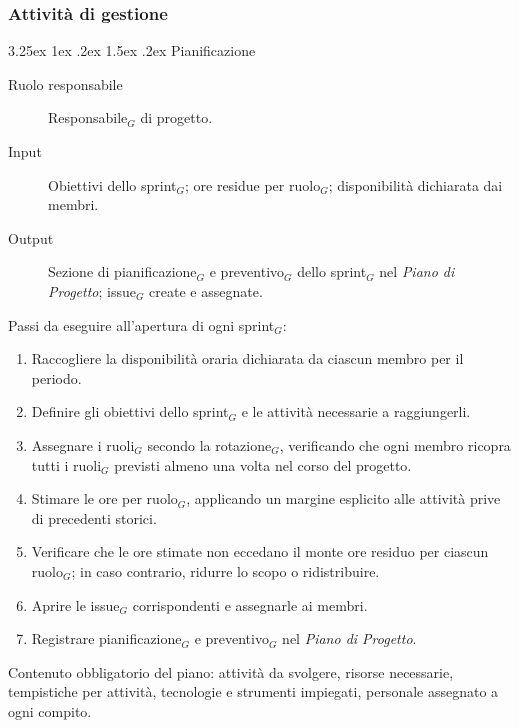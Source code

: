 \documentclass[a4paper, 10pt]{article}
\makeatletter
\renewcommand\paragraph{\@startsection{paragraph}{4}{\z@}%
  {3.25ex \@plus1ex \@minus .2ex}%
  {1.5ex \@plus .2ex}%
  {\normalfont\normalsize\bfseries}}
\makeatother
\begin{document}
\subsubsection{Attività di gestione}
\label{subsubsec:attivita_gestione}

\paragraph{Pianificazione}

\begin{description}
    \item[Ruolo responsabile] Responsabile$_G$ di progetto.
    \item[Input] Obiettivi dello sprint$_G$; ore residue per ruolo$_G$; disponibilità dichiarata dai membri.
    \item[Output] Sezione di pianificazione$_G$ e preventivo$_G$ dello sprint$_G$ nel \emph{Piano di Progetto}; issue$_G$ create e assegnate.
\end{description}

\noindent Passi da eseguire all'apertura di ogni sprint$_G$:
\begin{enumerate}
    \item Raccogliere la disponibilità oraria dichiarata da ciascun membro per il periodo.
    \item Definire gli obiettivi dello sprint$_G$ e le attività necessarie a raggiungerli.
    \item Assegnare i ruoli$_G$ secondo la rotazione$_G$, verificando che ogni membro ricopra tutti i ruoli$_G$ previsti almeno una volta nel corso del progetto.
    \item Stimare le ore per ruolo$_G$, applicando un margine esplicito alle attività prive di precedenti storici.
    \item Verificare che le ore stimate non eccedano il monte ore residuo per ciascun ruolo$_G$; in caso contrario, ridurre lo scopo o ridistribuire.
    \item Aprire le issue$_G$ corrispondenti e assegnarle ai membri.
    \item Registrare pianificazione$_G$ e preventivo$_G$ nel \emph{Piano di Progetto}.
\end{enumerate}

\noindent Contenuto obbligatorio del piano: attività da svolgere, risorse necessarie, tempistiche per attività, tecnologie e strumenti impiegati, personale assegnato a ogni compito.
\end{document}
